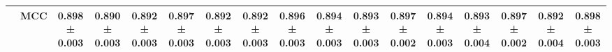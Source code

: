 \begin{table}[H]
{\begin{tabular}{llccccccccccccccc}
 & MCC & \textbf{0.898 ± 0.003} & 0.890 ± 0.003 & 0.892 ± 0.003 & \textbf{0.897 ± 0.003} & 0.892 ± 0.003 & 0.892 ± 0.003 & \textbf{0.896 ± 0.003} & \textbf{0.894 ± 0.003} & \textbf{0.893 ± 0.003} & \textbf{0.897 ± 0.002} & \textbf{0.894 ± 0.003} & \textbf{0.893 ± 0.004} & \textbf{0.897 ± 0.002} & \textbf{0.892 ± 0.004} & \textbf{0.898 ± 0.003} \\
\cline{1-17}
\bottomrule
\end{tabular}
    }
\end{table}
